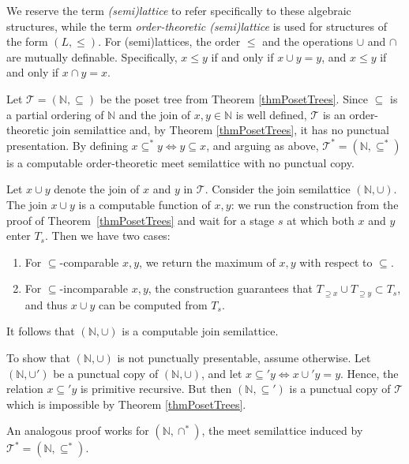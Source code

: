\documentclass[a4paper,UKenglish,cleveref, autoref, thm-restate]{lipics-v2021}
\begin{document}
We reserve the term \emph{(semi)lattice} to refer specifically to these algebraic structures, while the term \emph{order-theoretic (semi)lattice} is used for structures of the form $(L, \leq)$. 
For (semi)lattices, the order $\leq$ and the operations $\cup$ and $\cap$ are mutually definable. Specifically, $x \leq y$ if and only if $x \cup y = y$, and $x \leq y$ if and only if $x \cap y = x$.
\corLattices*
\begin{claimproof}
    Let $\mathcal T = (\mathbb N, \subseteq)$ be the poset tree from Theorem \ref{thmPosetTrees}. Since $\subseteq$ is a partial ordering of $\mathbb N$ and the join of $x,y \in \mathbb N$ is well defined, $\mathcal T$ is an order-theoretic join semilattice and, by Theorem \ref{thmPosetTrees}, it has no punctual presentation. By defining $x \subseteq^* y \Leftrightarrow y \subseteq x$, and arguing as above, $\mathcal T^* = (\mathbb N,\subseteq^*)$ is a computable order-theoretic meet semilattice with no punctual copy.

    Let $x \cup y $ denote the join of $x$ and $y$ in $\mathcal T$. Consider the join semilattice $(\mathbb N, \cup)$. The join $x \cup y$ is a computable function of $x,y$: we run the construction from the proof of Theorem~\ref{thmPosetTrees} and wait for a stage $s$ at which both $x$ and $y$ enter $T_s$. Then we have two cases:
    \begin{enumerate}
        \item For $\subseteq$-comparable $x,y$, we return the maximum of $x,y$ with respect to $\subseteq$.
        \item For $\subseteq$-incomparable $x,y$, the construction guarantees that $T_{\supseteq x} \cup T_{\supseteq y} \subset T_s$, and thus $x \cup y$ can be computed from $ T_s$.
    \end{enumerate}
 It follows that $(\mathbb N , \cup)$ is a computable join semilattice. 
 
 To show that $(\mathbb N, \cup)$ is not punctually presentable, assume otherwise. Let $(\mathbb N, \cup')$ be a punctual copy of $(\mathbb N,\cup)$, and let $x \subseteq' y \Leftrightarrow x \cup' y = y$. Hence, the relation $x \subseteq' y$ is primitive recursive. But then $(\mathbb N, \subseteq')$ is a punctual copy of $\mathcal T$ which is impossible by Theorem \ref{thmPosetTrees}.

An analogous proof works for $(\mathbb N, \cap^*)$, the meet semilattice induced by $\mathcal T^*= (\mathbb N, \subseteq^*)$. 
\end{claimproof}
\end{document}
